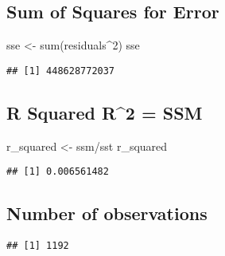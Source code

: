 \documentclass[
]{article}
\newenvironment{Shaded}{\begin{snugshade}}{\end{snugshade}}
\newcommand{\DecValTok}[1]{\textcolor[rgb]{0.00,0.00,0.81}{#1}}
\newcommand{\FunctionTok}[1]{\textcolor[rgb]{0.00,0.00,0.00}{#1}}
\newcommand{\NormalTok}[1]{#1}
\newcommand{\OtherTok}[1]{\textcolor[rgb]{0.56,0.35,0.01}{#1}}
\newcommand{\SpecialCharTok}[1]{\textcolor[rgb]{0.00,0.00,0.00}{#1}}
\begin{document}
\hypertarget{sum-of-squares-for-error}{%
\subsection{Sum of Squares for Error}\label{sum-of-squares-for-error}}

\begin{Shaded}
\begin{Highlighting}[]
\NormalTok{sse }\OtherTok{\textless{}{-}} \FunctionTok{sum}\NormalTok{(residuals}\SpecialCharTok{\^{}}\DecValTok{2}\NormalTok{)}
\NormalTok{sse}
\end{Highlighting}
\end{Shaded}

\begin{verbatim}
## [1] 448628772037
\end{verbatim}

\hypertarget{r-squared-r2-ssm}{%
\subsection{\texorpdfstring{R Squared R\^{}2 =
SSM\SST}{R Squared R\^{}2 = SSM}}\label{r-squared-r2-ssm}}

\begin{Shaded}
\begin{Highlighting}[]
\NormalTok{r\_squared }\OtherTok{\textless{}{-}}\NormalTok{ ssm}\SpecialCharTok{/}\NormalTok{sst}
\NormalTok{r\_squared}
\end{Highlighting}
\end{Shaded}

\begin{verbatim}
## [1] 0.006561482
\end{verbatim}

\hypertarget{number-of-observations}{%
\subsection{Number of observations}\label{number-of-observations}}

\begin{Shaded}
\end{Shaded}

\begin{verbatim}
## [1] 1192
\end{verbatim}
\end{document}
